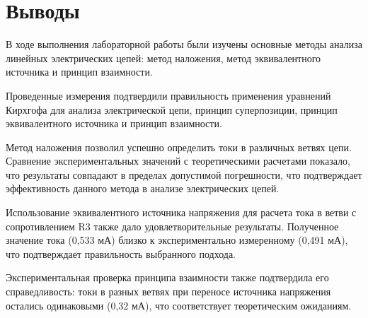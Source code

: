 \section{Выводы}

В ходе выполнения лабораторной работы были изучены основные методы
анализа линейных электрических цепей: метод наложения, 
метод эквивалентного источника и принцип взаимности. 

Проведенные измерения подтвердили правильность применения уравнений Кирхгофа для анализа электрической цепи, принцип суперпозиции, принцип эквивалентного источника и принцип взаимности.

Метод наложения позволил успешно определить токи в различных ветвях цепи. Сравнение экспериментальных значений с теоретическими расчетами показало, что результаты совпадают в пределах допустимой погрешности, что подтверждает эффективность данного метода в анализе электрических цепей.

Использование эквивалентного источника напряжения для расчета тока в ветви с сопротивлением R3 также дало удовлетворительные результаты. Полученное значение тока (0,533 мА) близко к экспериментально измеренному (0,491 мА), что подтверждает правильность выбранного подхода.

Экспериментальная проверка принципа взаимности также подтвердила его справедливость: токи в разных ветвях при переносе источника напряжения остались одинаковыми (0,32 мА), что соответствует теоретическим ожиданиям.
